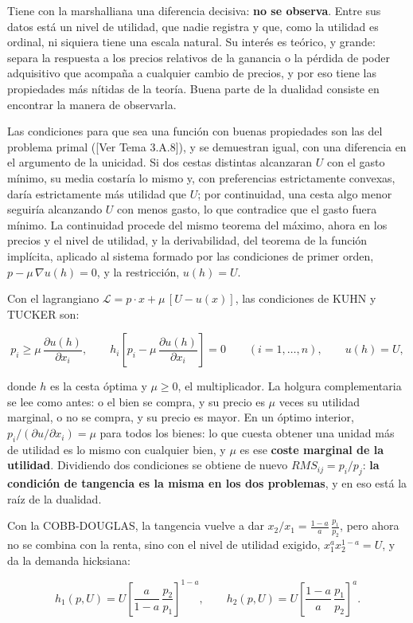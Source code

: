 \documentclass[10pt,a4paper]{article}
\newcommand{\authorfont}[1]{{\fontfamily{EBGaramond-TLF}\selectfont #1}}
\begin{document}
Tiene con la marshalliana una diferencia decisiva: \textbf{no se observa}. Entre sus datos está un nivel de utilidad, que nadie registra y que, como la utilidad es ordinal, ni siquiera tiene una escala natural. Su interés es teórico, y grande: separa la respuesta a los precios relativos de la ganancia o la pérdida de poder adquisitivo que acompaña a cualquier cambio de precios, y por eso tiene las propiedades más nítidas de la teoría. Buena parte de la dualidad consiste en encontrar la manera de observarla.

Las condiciones para que sea una función con buenas propiedades son las del problema primal ([\authorfont{Ver Tema 3.A.8}]), y se demuestran igual, con una diferencia en el argumento de la unicidad. Si dos cestas distintas alcanzaran $U$ con el gasto mínimo, su media costaría lo mismo y, con preferencias estrictamente convexas, daría estrictamente más utilidad que $U$; por continuidad, una cesta algo menor seguiría alcanzando $U$ con menos gasto, lo que contradice que el gasto fuera mínimo. La continuidad procede del mismo teorema del máximo, ahora en los precios y el nivel de utilidad, y la derivabilidad, del teorema de la función implícita, aplicado al sistema formado por las condiciones de primer orden, $p-\mu\,\nabla u(h)=0$, y la restricción, $u(h)=U$.

Con el lagrangiano $\mathcal{L}=p\cdot x+\mu\,[U-u(x)]$, las condiciones de KUHN y TUCKER son:

$$p_i\ge\mu\,\frac{\partial u(h)}{\partial x_i},\qquad h_i\left[p_i-\mu\,\frac{\partial u(h)}{\partial x_i}\right]=0\qquad(i=1,\dots,n),\qquad u(h)=U,$$

donde $h$ es la cesta óptima y $\mu\ge0$, el multiplicador. La holgura complementaria se lee como antes: o el bien se compra, y su precio es $\mu$ veces su utilidad marginal, o no se compra, y su precio es mayor. En un óptimo interior, $p_i/(\partial u/\partial x_i)=\mu$ para todos los bienes: lo que cuesta obtener una unidad más de utilidad es lo mismo con cualquier bien, y $\mu$ es ese \textbf{coste marginal de la utilidad}. Dividiendo dos condiciones se obtiene de nuevo $RMS_{ij}=p_i/p_j$: \textbf{la condición de tangencia es la misma en los dos problemas}, y en eso está la raíz de la dualidad.

Con la COBB-DOUGLAS, la tangencia vuelve a dar $x_2/x_1=\frac{1-a}{a}\,\frac{p_1}{p_2}$, pero ahora no se combina con la renta, sino con el nivel de utilidad exigido, $x_1^{a}x_2^{1-a}=U$, y da la demanda hicksiana:

$$h_1(p,U)=U\left[\frac{a}{1-a}\,\frac{p_2}{p_1}\right]^{1-a},\qquad h_2(p,U)=U\left[\frac{1-a}{a}\,\frac{p_1}{p_2}\right]^{a}.$$
\end{document}
